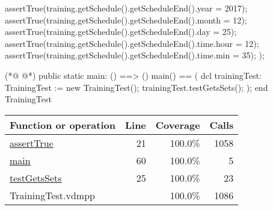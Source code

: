 \begin{vdmpp}[breaklines=true]
   assertTrue(training.getSchedule().getScheduleEnd().year = 2017);
   assertTrue(training.getSchedule().getScheduleEnd().month = 12);
   assertTrue(training.getSchedule().getScheduleEnd().day = 25);
   assertTrue(training.getSchedule().getScheduleEnd().time.hour = 12);
   assertTrue(training.getSchedule().getScheduleEnd().time.min = 35);
  );

(*@
\label{main:60}
@*)
 public static main: () ==> ()
   main() == (
    dcl trainingTest: TrainingTest := new TrainingTest();
    trainingTest.testGetsSets();
   );
end TrainingTest
\end{vdmpp}
\bigskip
\begin{longtable}{|l|r|r|r|}
\hline
Function or operation & Line & Coverage & Calls \\
\hline
\hline
\hyperref[assertTrue:21]{assertTrue} & 21&100.0\% & 1058 \\
\hline
\hyperref[main:60]{main} & 60&100.0\% & 5 \\
\hline
\hyperref[testGetsSets:25]{testGetsSets} & 25&100.0\% & 23 \\
\hline
\hline
TrainingTest.vdmpp & & 100.0\% & 1086 \\
\hline
\end{longtable}

